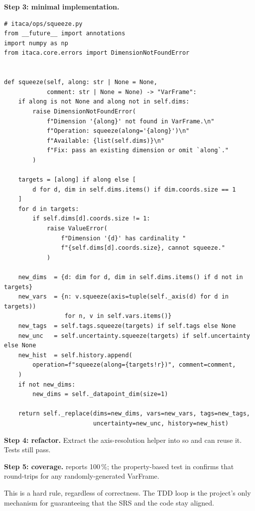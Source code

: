 \textbf{Step 3: minimal implementation.}
\begin{lstlisting}
# itaca/ops/squeeze.py
from __future__ import annotations
import numpy as np
from itaca.core.errors import DimensionNotFoundError


def squeeze(self, along: str | None = None,
            comment: str | None = None) -> "VarFrame":
    if along is not None and along not in self.dims:
        raise DimensionNotFoundError(
            f"Dimension '{along}' not found in VarFrame.\n"
            f"Operation: squeeze(along='{along}')\n"
            f"Available: {list(self.dims)}\n"
            f"Fix: pass an existing dimension or omit `along`."
        )

    targets = [along] if along else [
        d for d, dim in self.dims.items() if dim.coords.size == 1
    ]
    for d in targets:
        if self.dims[d].coords.size != 1:
            raise ValueError(
                f"Dimension '{d}' has cardinality "
                f"{self.dims[d].coords.size}, cannot squeeze."
            )

    new_dims  = {d: dim for d, dim in self.dims.items() if d not in targets}
    new_vars  = {n: v.squeeze(axis=tuple(self._axis(d) for d in targets))
                 for n, v in self.vars.items()}
    new_tags  = self.tags.squeeze(targets) if self.tags else None
    new_unc   = self.uncertainty.squeeze(targets) if self.uncertainty else None
    new_hist  = self.history.append(
        operation=f"squeeze(along={targets!r})", comment=comment,
    )
    if not new_dims:
        new_dims = self._datapoint_dim(size=1)

    return self._replace(dims=new_dims, vars=new_vars, tags=new_tags,
                         uncertainty=new_unc, history=new_hist)
\end{lstlisting}

\textbf{Step 4: refactor.} Extract the axis-resolution helper into
 so  and  can reuse it.
Tests still pass.

\textbf{Step 5: coverage.} 
reports 100\,\%; the property-based test in
 confirms that
 round-trips for any
randomly-generated VarFrame.

\begin{noteinfo}
This is a hard rule, regardless of correctness. The TDD loop is the
project's only mechanism for guaranteeing that the SRS and the code stay
aligned.
\end{noteinfo}

